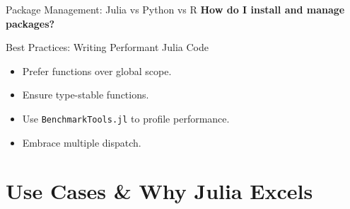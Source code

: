 \documentclass{beamer}
\begin{document}
\begin{frame}{Package Management: Julia vs Python vs R}
\textbf{How do I install and manage packages?}

\vspace{0.3cm}
\begin{table}[h]
\centering
{}
\caption{Comparison of environment and package management across Julia, Python, and R}
\end{table}

\end{frame}



\begin{frame}{Best Practices: Writing Performant Julia Code}
\begin{itemize}
    \item Prefer functions over global scope.
    \item Ensure type-stable functions.
    \item Use \texttt{BenchmarkTools.jl} to profile performance.
    \item Embrace multiple dispatch.
\end{itemize}
\end{frame}

\section{Use Cases \& Why Julia Excels}
\end{document}
